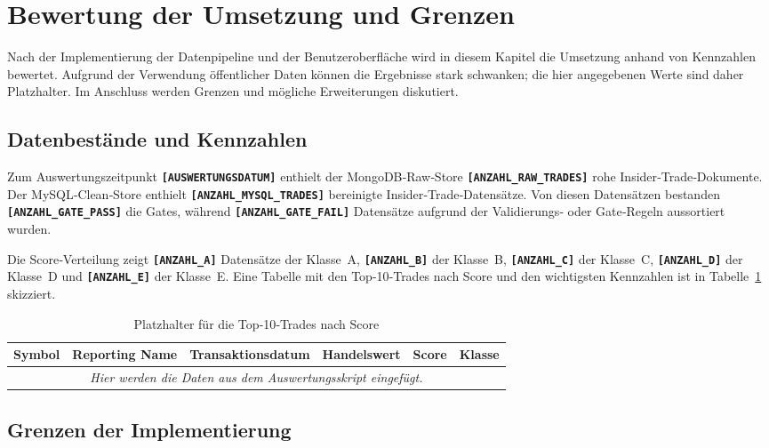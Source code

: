 \section{Bewertung der Umsetzung und Grenzen}
\label{sec:bewertung}

Nach der Implementierung der Datenpipeline und der Benutzeroberfläche wird in diesem Kapitel die Umsetzung anhand von Kennzahlen bewertet. Aufgrund der Verwendung öffentlicher Daten können die Ergebnisse stark schwanken; die hier angegebenen Werte sind daher Platzhalter. Im Anschluss werden Grenzen und mögliche Erweiterungen diskutiert.

\subsection{Datenbestände und Kennzahlen}

Zum Auswertungszeitpunkt \texttt{\textbf{[AUSWERTUNGSDATUM]}} enthielt der MongoDB‑Raw‑Store \texttt{\textbf{[ANZAHL\_RAW\_TRADES]}} rohe Insider‑Trade‑Dokumente. Der MySQL‑Clean‑Store enthielt \texttt{\textbf{[ANZAHL\_MYSQL\_TRADES]}} bereinigte Insider‑Trade‑Datensätze. Von diesen Datensätzen bestanden \texttt{\textbf{[ANZAHL\_GATE\_PASS]}} die Gates, während \texttt{\textbf{[ANZAHL\_GATE\_FAIL]}} Datensätze aufgrund der Validierungs‑ oder Gate‑Regeln aussortiert wurden.

Die Score‑Verteilung zeigt \texttt{\textbf{[ANZAHL\_A]}} Datensätze der Klasse A, \texttt{\textbf{[ANZAHL\_B]}} der Klasse B, \texttt{\textbf{[ANZAHL\_C]}} der Klasse C, \texttt{\textbf{[ANZAHL\_D]}} der Klasse D und \texttt{\textbf{[ANZAHL\_E]}} der Klasse E. Eine Tabelle mit den Top‑10‑Trades nach Score und den wichtigsten Kennzahlen ist in Tabelle~\ref{tab:top10} skizziert.

\begin{table}[H]
\centering
\caption{Platzhalter für die Top‑10‑Trades nach Score}
\label{tab:top10}
\begin{tabular}{@{}llllll@{}}
\toprule
Symbol & Reporting Name & Transaktionsdatum & Handelswert & Score & Klasse \\
\midrule
\multicolumn{6}{c}{\textit{Hier werden die Daten aus dem Auswertungsskript eingefügt.}} \\
\bottomrule
\end{tabular}
\end{table}

\subsection{Grenzen der Implementierung}

